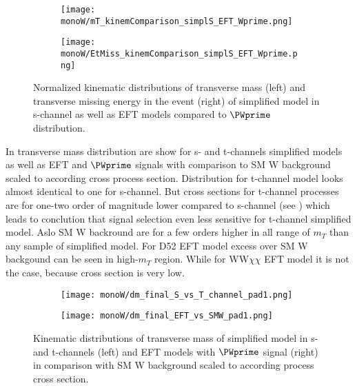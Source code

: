 \begin{figure}[]

\begin{subfigure}{.5\textwidth}
  \centering
  \texttt{[image: monoW/mT\_kinemComparison\_simplS\_EFT\_Wprime.png]}
\end{subfigure}%
\begin{subfigure}{.5\textwidth}
  \centering
  \texttt{[image: monoW/EtMiss\_kinemComparison\_simplS\_EFT\_Wprime.png]}
\end{subfigure}

\caption{Normalized kinematic distributions of transverse mass (left) and transverse missing energy in the event (right) of simplified model in s-channel as well as EFT models compared to $\PWprime$ distribution.}
  \label{fig:kinematicsSChannel}
\end{figure}

In  transverse mass distribution are show for s- and t-channels simplified models as well as EFT and $\PWprime$ signals with comparison to SM W background 
scaled to according cross process section. Distribution for t-channel model looks almost identical to one for s-channel. 
But cross sections for t-channel processes are for one-two order of magnitude lower compared to s-channel (see ) which leads to conclution
that signal selection even less sensitive for t-channel simplified model. Aslo SM W backround are for a few orders higher in all range of $m_{T}$ than any sample of simplified model.
For D52 EFT model excess over SM W backgound can be seen in high-$m_{T}$ region. While for WW$\chi\chi$ EFT model it is not the case, because cross section is very low.


\begin{figure}[]
\begin{subfigure}{.5\textwidth}
  \centering
  \texttt{[image: monoW/dm\_final\_S\_vs\_T\_channel\_pad1.png]} 
\end{subfigure}%
\begin{subfigure}{.5\textwidth}
  \centering
  \texttt{[image: monoW/dm\_final\_EFT\_vs\_SMW\_pad1.png]}
\end{subfigure}
\caption{Kinematic distributions of transverse mass of simplified model in s- and t-channels (left) 
and EFT models with $\PWprime$ signal (right) in comparison with SM W background scaled to according process cross section.}
  \label{fig:scaledKin}
\end{figure}

